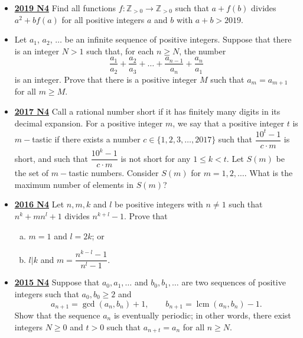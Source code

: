 \documentclass[11pt]{scrartcl}
\begin{document}
\begin{itemize}[leftmargin=*]
\item  \href{https://artofproblemsolving.com/community/c6h2279056p17829445}{\textbf{2019 N4}} Find all functions $f:\mathbb Z_{>0}\to \mathbb Z_{>0}$ such that $a+f(b)$ divides $a^2+bf(a)$ for all positive integers $a$ and $b$ with $a+b>2019$.
\item  {} Let $a_1$, $a_2$, $\dots$ be an infinite sequence of positive integers. Suppose that there is an integer $N > 1$ such that, for each $n \geqslant  N$, the number $$\frac{a_1}{a_2} + \frac{a_2}{a_3} + \dots + \frac{a_{n-1}}{a_n} + \frac{a_n}{a_1}$$is an integer. Prove that there is a positive integer $M$ such that $a_m = a_{m+1}$ for all $m \geqslant  M$.
\newpage
\item  \href{https://artofproblemsolving.com/community/c6h1671331p10632689}{\textbf{2017 N4}} Call a rational number short if it has finitely many digits in its decimal expansion. For a positive integer $m$, we say that a positive integer $t$ is $m-$tastic if there exists a number $c\in \{1,2,3,\dots ,2017\}$ such that $\dfrac{10^t-1}{c\cdot m}$ is short, and such that $\dfrac{10^k-1}{c\cdot m}$ is not short for any $1\leqslant k<t$. Let $S(m)$ be the set of $m-$tastic numbers. Consider $S(m)$ for $m=1,2,\dots{}.$ What is the maximum number of elements in $S(m)$?
\item  \href{https://artofproblemsolving.com/community/c6h1480731p8639358}{\textbf{2016 N4}} Let $n, m, k$ and $l$ be positive integers with $n \neq 1$ such that $n^k + mn^l + 1$ divides $n^{k+l} - 1$. Prove that 
\begin{enumerate}[(a)]
    \item $m = 1$ and $l = 2k$; or 
    \item $l|k$ and $m = \dfrac{n^{k-l}-1}{n^l-1}$.
\end{enumerate}

\item \href{https://artofproblemsolving.com/community/c6h1268845p6622169}{\textbf{2015 N4}} Suppose that $a_0, a_1, \dots $ and $b_0, b_1, \dots$ are two sequences of positive integers such that $a_0, b_0 \geqslant  2$ and\[ a_{n+1} = \gcd{(a_n, b_n)} + 1, \qquad b_{n+1} = \operatorname{lcm}{(a_n, b_n)} - 1. \]Show that the sequence $a_n$ is eventually periodic; in other words, there exist integers $N \geqslant  0$ and $t > 0$ such that $a_{n+t} = a_n$ for all $n \geqslant  N$.


\end{itemize}
\end{document}
